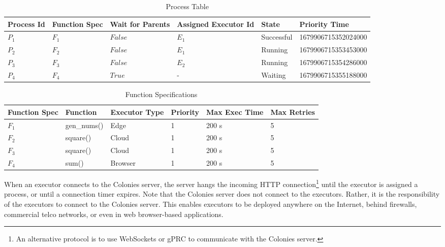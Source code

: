 \documentclass{article}
\begin{document}
\begin{table}[t]
	\caption{Process Table}
	\centering
	\begin{tabular}{llllll}
		\toprule
		\cmidrule(r){1-2}
        Process Id & Function Spec & Wait for Parents & Assigned Executor Id & State      & Priority Time \\
		\midrule
        $P_{1}$    & $F_{1}$       & $False$          & $E_{1}$              & Successful & 1679906715352024000 \\
        $P_{2}$    & $F_{2}$       & $False$          & $E_{1}$              & Running    & 1679906715353453000 \\
        $P_{3}$    & $F_{3}$       & $False$          & $E_{2}$              & Running    & 1679906715354286000 \\
        $P_{4}$    & $F_{4}$       & $True$           & -                    & Waiting    & 1679906715355188000 \\
		\bottomrule
	\end{tabular}
	\label{proctable}
\end{table}

\begin{table}[t]
	\caption{Function Specifications}
	\centering
	\begin{tabular}{llllll}
		\toprule
		\cmidrule(r){1-2}
        Function Spec & Function        & Executor Type & Priority & Max Exec Time & Max Retries \\
		\midrule
        $F_{1}$       & gen\_nums()     & Edge          & 1        & 200 s         & 5 \\
        $F_{2}$       & square()        & Cloud         & 1        & 200 s         & 5 \\
        $F_{3}$       & square()        & Cloud         & 1        & 200 s         & 5 \\
        $F_{4}$       & sum()           & Browser       & 1        & 200 s         & 5 \\
		\bottomrule
	\end{tabular}
	\label{functable}
\end{table}

When an executor connects to the Colonies server, the server hangs the incoming HTTP connection\footnote{An alternative protocol is to use WebSockets or gPRC to communicate with the Colonies server.} until the executor is assigned a process, or until a connection timer expires. Note that the Colonies server does not connect to the executors. Rather, it is the responsibility of the executors to connect to the Colonies server. This enables executors to be deployed anywhere on the Internet, behind firewalls, commercial telco networks, or even in web browser-based applications.
\end{document}
